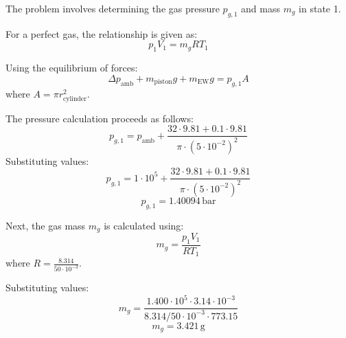 The problem involves determining the gas pressure \( p_{g,1} \) and mass \( m_g \) in state 1.  

For a perfect gas, the relationship is given as:  
\[
p_1 V_1 = m_g R T_1
\]  

Using the equilibrium of forces:  
\[
\Delta p_{\text{amb}} + m_{\text{piston}} g + m_{\text{EW}} g = p_{g,1} A
\]  
where \( A = \pi r_{\text{cylinder}}^2 \).  

The pressure calculation proceeds as follows:  
\[
p_{g,1} = p_{\text{amb}} + \frac{32 \cdot 9.81 + 0.1 \cdot 9.81}{\pi \cdot (5 \cdot 10^{-2})^2}
\]  
Substituting values:  
\[
p_{g,1} = 1 \cdot 10^5 + \frac{32 \cdot 9.81 + 0.1 \cdot 9.81}{\pi \cdot (5 \cdot 10^{-2})^2}
\]  
\[
p_{g,1} = 1.40094 \, \text{bar}
\]  

Next, the gas mass \( m_g \) is calculated using:  
\[
m_g = \frac{p_1 V_1}{R T_1}
\]  
where \( R = \frac{8.314}{50 \cdot 10^{-3}} \).  

Substituting values:  
\[
m_g = \frac{1.400 \cdot 10^5 \cdot 3.14 \cdot 10^{-3}}{8.314 / 50 \cdot 10^{-3} \cdot 773.15}
\]  
\[
m_g = 3.421 \, \text{g}
\]